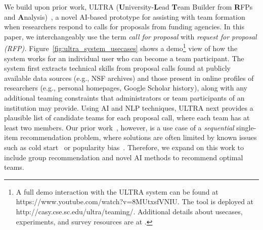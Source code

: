 We build upon prior work, ULTRA (\textbf{U}niversity-\textbf{L}ead \textbf{T}eam Builder from \textbf{R}FPs and \textbf{A}nalysis)~\cite{srivastava2022ultra}, a novel AI-based prototype for assisting with team formation when researchers respond to calls for proposals from funding agencies. In this paper, we interchangeably use the term \textit{call for proposal} with \textit{request for proposal (RFP).} 
Figure~\ref{fig:ultra_system_usecases} shows a demo\footnote{A full demo interaction with the ULTRA system can be found at https://www.youtube.com/watch?v=8MUtxsfVNIU. The tool is deployed at http://casy.cse.sc.edu/ultra/teaming/. Additional details about usecases, experiments, and survey resources are at \cite{ultra-resources}.} view of how the system works for an individual user who can become a team participant. 
The system first extracts technical skills from proposal calls found at publicly available data sources (e.g., NSF archives) and those present in online profiles of researchers (e.g., personal homepages, Google Scholar history), along with any additional teaming constraints that administrators or team participants of an institution may provide. Using AI and NLP techniques, ULTRA next provides a plausible list of candidate teams for each proposal call, where each team has at least two members. Our prior work~\cite{srivastava2022ultra}, however, is a use case of a {\em sequential} single-item recommendation problem, where solutions are often limited by known issues such as cold start~\cite{abdollahpouri2019managing} or popularity bias~\cite{yalcin2022evaluating}. Therefore, we expand on this work to include group recommendation and novel AI methods to recommend optimal teams. 

